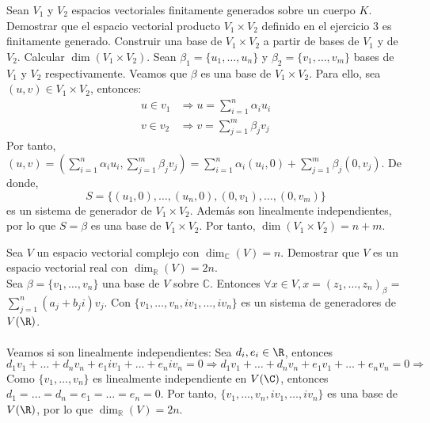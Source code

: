 \begin{ejercicio} Sean \( V_1 \) y \( V_2 \) espacios vectoriales finitamente generados sobre un cuerpo \( K \). Demostrar que el espacio vectorial producto \( V_1 \times V_2 \) definido en el ejercicio 3 es finitamente generado. Construir una base de \( V_1 \times V_2 \) a partir de bases de \( V_1 \) y de \( V_2 \). Calcular \( \dim(V_1 \times V_2) \).
	Sean $\beta_1 = \{ u_1, \ldots, u_n \}$ y $\beta_2 = \{ v_1, \ldots, v_m \}$ bases de $V_1$ y $V_2$ respectivamente.
	Veamos que $\beta$ es una base de $V_1 \times V_2$. Para ello, sea $(u,v) \in V_1 \times V_2$, entonces:
	\begin{align*}
		u \in v_1 & \Rightarrow u = \sum_{i=1}^{n} \alpha_i u_i \\
		v \in v_2 & \Rightarrow v = \sum_{j=1}^{m} \beta_j v_j
	\end{align*}
	Por tanto, $(u,v) = (\sum_{i=1}^{n} \alpha_i u_i, \sum_{j=1}^{m} \beta_j v_j) = \sum_{i=1}^{n} \alpha_i (u_i,0) + \sum_{j=1}^{m} \beta_j (0,v_j)$. De donde,
	\begin{equation*}
		S = \{ (u_1,0), \ldots, (u_n,0), (0,v_1), \ldots, (0,v_m) \}
	\end{equation*}
	es un sistema de generador de $V_1 \times V_2$. Además son linealmente independientes, por lo que $S = \beta$ es una base de $V_1 \times V_2$. Por tanto, $\dim(V_1 \times V_2) = n+m$.
\end{ejercicio}



\begin{ejercicio} Sea \( V \) un espacio vectorial complejo con \( \dim_{\mathbb{C}}(V) = n \). Demostrar que \( V \) es un espacio vectorial real con \( \dim_{\mathbb{R}}(V) = 2n \).\\
	Sea $\beta = \{ v_1, \ldots, v_n \}$ una base de $V$ sobre $\mathbb{C}$. Entonces $\forall x \in V, x = (z_1, \ldots, z_n)_{\beta}$
	= $\sum_{j=1}^{n} (a_j + b_j i) v_j$. Con $\{ v_1, \ldots, v_n, i v_1, \ldots, i v_n \}$ es un sistema de generadores de $V(\R)$.
	\\ \\Veamos si son linealmente independientes:
	Sea $d_i, e_i \in \R$, entonces $d_1 v_1 + \ldots + d_n v_n + e_1 i v_1 + \ldots + e_n i v_n = 0 \Rightarrow
		d_1 v_1 + \ldots + d_n v_n + e_1 v_1 + \ldots + e_n v_n = 0 \Rightarrow
	$ Como $\{v_1, \ldots, v_n\}$ es linealmente independiente en $V(\C)$, entonces $d_1 = \ldots = d_n = e_1 = \ldots = e_n = 0$.
	Por tanto, $\{ v_1, \ldots, v_n, i v_1, \ldots, i v_n \}$ es una base de $V(\R)$, por lo que $\dim_{\mathbb{R}}(V) = 2n$.
\end{ejercicio}



